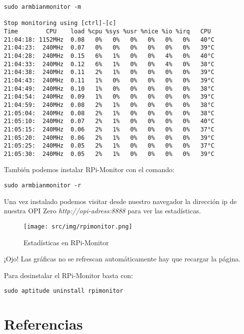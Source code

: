 \documentclass[12pt,spanish,]{scrartcl}
\begin{document}
\begin{verbatim}
sudo armbianmonitor -m

Stop monitoring using [ctrl]-[c]
Time        CPU    load %cpu %sys %usr %nice %io %irq   CPU
21:04:18: 1152MHz  0.08   0%   0%   0%   0%   0%   0%   40°C
21:04:23:  240MHz  0.07   0%   0%   0%   0%   0%   0%   39°C
21:04:28:  240MHz  0.15   6%   1%   0%   0%   4%   0%   40°C
21:04:33:  240MHz  0.12   6%   1%   0%   0%   4%   0%   38°C
21:04:38:  240MHz  0.11   2%   1%   0%   0%   0%   0%   39°C
21:04:43:  240MHz  0.11   1%   0%   0%   0%   0%   0%   39°C
21:04:49:  240MHz  0.10   1%   0%   0%   0%   0%   0%   38°C
21:04:54:  240MHz  0.09   1%   0%   0%   0%   0%   0%   39°C
21:04:59:  240MHz  0.08   2%   1%   0%   0%   0%   0%   38°C
21:05:04:  240MHz  0.08   2%   1%   0%   0%   0%   0%   38°C
21:05:10:  240MHz  0.07   2%   1%   0%   0%   0%   0%   40°C
21:05:15:  240MHz  0.06   2%   1%   0%   0%   0%   0%   37°C
21:05:20:  240MHz  0.06   2%   1%   0%   0%   0%   0%   39°C
21:05:25:  240MHz  0.05   2%   1%   0%   0%   0%   0%   37°C
21:05:30:  240MHz  0.05   2%   1%   0%   0%   0%   0%   39°C
\end{verbatim}

También podemos instalar RPi-Monitor con el comando:

\begin{verbatim}
sudo armbianmonitor -r
\end{verbatim}

Una vez instalado podemos visitar desde nuestro navegador la dirección
ip de nuestra OPI Zero \emph{http://opi-adress:8888} para ver las
estadísticas.

\begin{figure}
\centering
\texttt{[image: src/img/rpimonitor.png]}
\caption{Estadísticas en RPi-Monitor}
\end{figure}

¡Ojo! Las gráficas no se refrescan automáticamente hay que recargar la
página.

Para desinstalar el RPi-Monitor basta con:

\begin{verbatim}
sudo aptitude uninstall rpimonitor
\end{verbatim}

\hypertarget{referencias-1}{%
\section{Referencias}\label{referencias-1}}
\end{document}
